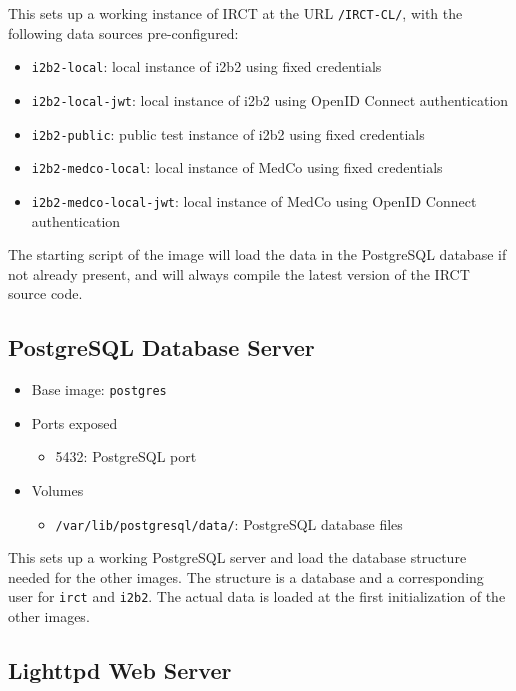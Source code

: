 This sets up a working instance of IRCT at the URL \verb|/IRCT-CL/|, with the following data sources pre-configured:
\begin{itemize}
    \item \verb|i2b2-local|: local instance of i2b2 using fixed credentials
    \item \verb|i2b2-local-jwt|: local instance of i2b2 using OpenID Connect authentication
    \item \verb|i2b2-public|: public test instance of i2b2 using fixed credentials
    \item \verb|i2b2-medco-local|: local instance of MedCo using fixed credentials
    \item \verb|i2b2-medco-local-jwt|: local instance of MedCo using OpenID Connect authentication
\end{itemize}

The starting script of the image will load the data in the PostgreSQL database if not already present, and will always compile the latest version of the IRCT source code.



\subsection{PostgreSQL Database Server}

\begin{itemize}
    \item Base image: \verb|postgres|
    \item Ports exposed
        \begin{itemize}
        \item 5432: PostgreSQL port
        \end{itemize}
        
    \item Volumes
        \begin{itemize}
        \item \verb|/var/lib/postgresql/data/|: PostgreSQL database files
        \end{itemize}
\end{itemize}

This sets up a working PostgreSQL server and load the database structure needed for the other images.
The structure is a database and a corresponding user for \verb|irct| and \verb|i2b2|.
The actual data is loaded at the first initialization of the other images.


\subsection{Lighttpd Web Server}

